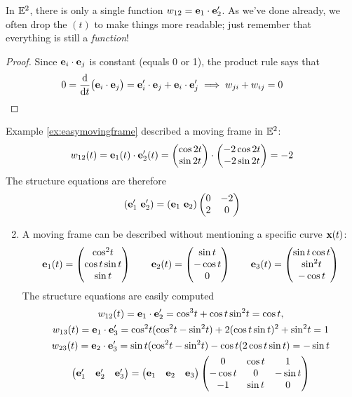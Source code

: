 
In $\mathbb{E}^2$, there is only a single function $w_{12}={\mathbf{e}}_1\cdot {\mathbf{e}}_2'$. As we've done already, we often drop the $(t)$ to make things more readable; just remember that everything is still a \emph{function}!


\begin{proof}
	Since ${\mathbf{e}}_i\cdot{\mathbf{e}}_j$ is constant (equals 0 or 1), the product rule says that
  \[
  	0=\frac{\mathrm{d} }{\mathrm{d} t}\bigl({\mathbf{e}}_i\cdot{\mathbf{e}}_j\bigr) ={\mathbf{e}}_i'\cdot{\mathbf{e}}_j+{\mathbf{e}}_i\cdot{\mathbf{e}}_j'  \implies w_{ji}+w_{ij}=0\tag*{\qedhere}
  \]
\end{proof}

\begin{examples}{}{}
	\exstart Example \ref{ex:easymovingframe} described a moving frame in $\mathbb{E}^2$:
	\[
		w_{12}(t)={\mathbf{e}}_1(t)\cdot {\mathbf{e}}_2'(t)=\begin{pmatrix}\cos 2t\\\sin 2t\end{pmatrix}\cdot\begin{pmatrix}-2\cos 2t\\-2\sin 2t\end{pmatrix}=-2
	\]
	The structure equations are therefore
	\[
		(\ve_1'\ \ve_2')=(\ve_1\ \ve_2)
		\begin{pmatrix}
			0&-2\\
			2&0
		\end{pmatrix}
	\]
	\begin{enumerate}\setcounter{enumi}{1}
		\item A moving frame can be described without mentioning a specific curve ${\mathbf{x}}(t)$:
		\[
			{\mathbf{e}}_1(t) =\begin{pmatrix}\cos^2\!t\\\cos t\sin t\\\sin t\end{pmatrix}\qquad {\mathbf{e}}_2(t) =\begin{pmatrix}\sin t\\-\cos t\\0\end{pmatrix}\qquad {\mathbf{e}}_3(t) =\begin{pmatrix}\sin t\cos t\\\sin^2\!t\\-\cos t\end{pmatrix}
		\]
		The structure equations are easily computed
		\begin{gather*}
			w_{12}(t) =\ve_1\cdot\ve_2' =\cos^3\!t+\cos t\sin^2\!t =\cos t,\\
			w_{13}(t) =\ve_1\cdot\ve_3' =\cos^2\!t(\cos^2\!t-\sin^2\!t)+2(\cos t\sin t)^2+\sin^2\!t =1\\
			w_{23}(t) =\ve_2\cdot\ve_3' =\sin t(\cos^2\!t-\sin^2\!t)-\cos t(2\cos t\sin t) =-\sin t\\
			\begin{pmatrix}
	  		\ve_1'&\ve_2'&\ve_3'
	  	\end{pmatrix}
	  	=
			\begin{pmatrix}
				\ve_1&\ve_2&\ve_3
			\end{pmatrix}
			\begin{pmatrix}
				0&\cos t&1\\
				-\cos t&0&-\sin t\\
				-1&\sin t&0
			\end{pmatrix}
		\end{gather*}
	\end{enumerate}
\end{examples}


